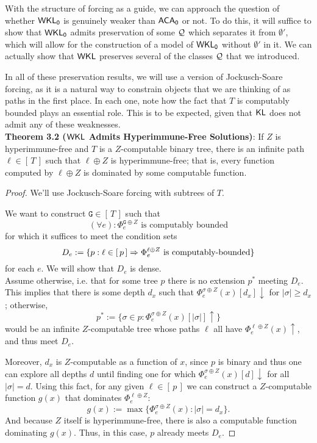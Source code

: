 \documentclass{amsart}
\begin{document}
	With the structure of forcing as a guide, we can approach the question of whether $\operatorname{\sf{WKL_0}}$ is genuinely weaker than $\operatorname{\sf{ACA_0}}$ or not. To do this, it will suffice to show that $\operatorname{\sf{WKL_0}}$ admits preservation of some $\mathcal{Q}$ which separates it from $\emptyset'$, which will allow for the construction of a model of $\operatorname{\sf{WKL_0}}$ without $\emptyset'$ in it. We can actually show that $\sf{WKL}$ preserves several of the classes $\mathcal{Q}$ that we introduced.
	
	In all of these preservation results, we will use a version of Jockusch-Soare forcing, as it is a natural way to constrain objects that we are thinking of as paths in the first place. In each one, note how the fact that $T$ is computably bounded plays an essential role. This is to be expected, given that $\operatorname{\sf{KL}}$ does not admit any of these weaknesses.\\
	
	\noindent \textbf{Theorem 3.2 ($\sf{WKL}$ Admits Hyperimmune-Free Solutions)}: If $Z$ is hyperimmune-free and $T$ is a $Z$-computable binary tree, there is an infinite path $\ell\in [\,T\,]$ such that $\ell\oplus Z$ is hyperimmune-free; that is, every function computed by $\ell\oplus Z$ is dominated by some computable function.  
	\begin{proof} We'll use Jockusch-Soare forcing with subtrees of $T$.
		
		We want to construct $\mathtt{G}\in [\,T\,]$ such that
		$$
		(\forall e): \Phi_e^{\mathtt{G}\oplus Z} \text{ is computably bounded} 
		$$
		for which it suffices to meet the condition sets
		$$
		D_e := \{p: \ell \in [\,p\,] \Rightarrow \Phi_e^{\ell\oplus Z} \text{ is computably-bounded}\}
		$$
		for each $e$. We will show that $D_e$ is dense. \\
		
		Assume otherwise, i.e. that for some tree $p$ there is no extension $p^*$ meeting $D_e$. This implies that there is some depth $d_x$ such that $\Phi_e^{\sigma\oplus Z}(x)[d_x]\downarrow$ for $|\sigma|\geq d_x$; otherwise,
		$$
		p^* := \{\sigma\in p : \Phi_e^{\sigma\oplus Z}(x)[|\sigma|]\uparrow \}
		$$
		would be an infinite $Z$-computable tree whose paths $\ell$ all have $\Phi_e^{\ell\oplus Z}(x)\uparrow$, and thus meet $D_e$.
		
		Moreover, $d_x$ is $Z$-computable as a function of $x$, since $p$ is binary and thus one can explore all depths $d$ until finding one for which $\Phi_e^{\sigma\oplus Z}(x)[d]\downarrow$ for all $|\sigma|=d$. Using this fact, for any given $\ell\in [\,p\,]$ we can construct a $Z$-computable function $g(x)$ that dominates $\Phi_e^{\ell\oplus Z}$:
		$$
		g(x) := \max\{\Phi_e^{\sigma\oplus Z}(x): |\sigma|=d_x\}.
		$$
		And because $Z$ itself is hyperimmune-free, there is also a computable function dominating $g(x)$. Thus, in this case, $p$ already meets $D_e$.
	\end{proof}\\
	
\end{document}
